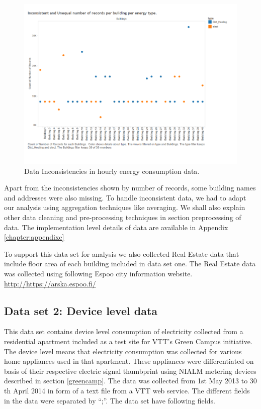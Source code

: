 \begin{figure}[!ht]
    \begin{center}
      \includegraphics[width=\textwidth]{images/incon.pdf}
      \caption{Data Inconsistencies in hourly energy consumption data.}
      \label{fig:incon}
    \end{center}
  \end{figure} 
Apart from the inconsistencies shown by number of records, some building names and addresses were also missing. To handle inconsistent data, we had to adapt our analysis using aggregation techniques like averaging. We shall also explain other data cleaning and pre-processing techniques in section preprocessing of data. The implementation level details of data are available in Appendix \ref{chapter:appendixc}

To support this data set for analysis we also collected Real Estate data that include floor area of each building included in data set one. The Real Estate data was collected using following Espoo city information website.
\url{http://https://arska.espoo.fi/}


\subsection{Data set 2: Device level data} \label{nialmset}
This data set contains device level consumption of electricity collected from a residential apartment included as a test site for VTT's Green Campus initiative. The device level means that electricity  consumption  was collected for various home appliances used in that apartment. These appliances were differentiated on basis of their respective electric signal thumbprint using NIALM metering devices described in section \ref{greencamp}. The data was collected from 1st May 2013 to 30 th April 2014 in form of a text file from a VTT web service. The different fields in the data were separated by ``;''. The data set have following fields.

